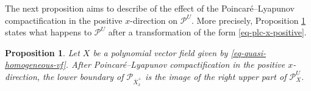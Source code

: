 \documentclass[12pt]{amsart}
\newtheorem{proposition}[theorem]{Proposition}
\newtheorem{example}[theorem]{Example}
\begin{document}



The next proposition aims to describe of the effect of the Poincaré--Lyapunov compactification in the positive $x$-direction on $\mathcal{P}^{U}$. More precisely, Proposition \ref{prop-plc-x-dir} states what happens to $\mathcal{P}^{U}$ after a transformation of the form \eqref{eq-plc-x-positive}.

\begin{proposition}\label{prop-plc-x-dir}
Let $X$ be a polynomial vector field given by \eqref{eq-quasi-homogeneous-vf}. After Poincaré--Lyapunov compactification in the positive $x$-direction, the lower boundary of $\mathcal{P}_{\overline{X}^{+}_{x}}$  is the image of the right upper part of $\mathcal{P}^{U}_{X}$.
\end{proposition}
\end{document}
